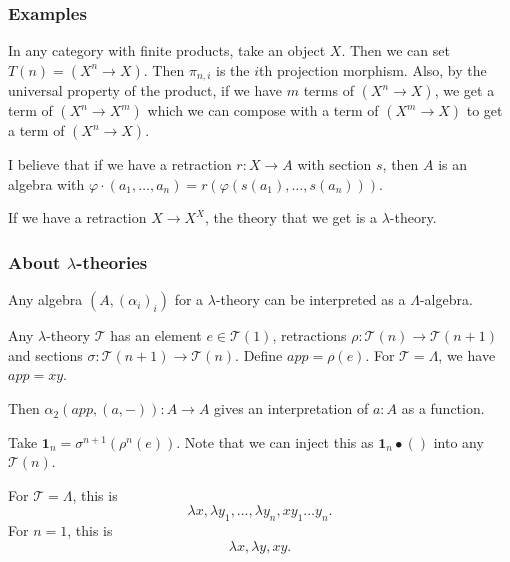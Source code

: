 \documentclass[aspectratio=169]{fancyslides} %
\begin{document}
  \begin{frame}
    \frametitle{Examples}

    In any category with finite products, take an object $ X $. Then we can set $ T(n) = (X^n \to X) $. Then $ \pi_{n, i} $ is the $ i $th projection morphism. Also, by the universal property of the product, if we have $ m $ terms of $ (X^n \to X) $, we get a term of $ (X^n \to X^m) $ which we can compose with a term of $ (X^m \to X) $ to get a term of $ (X^n \to X) $.

    \pause
    \vfill

    I believe that if we have a retraction $ r: X \to A $ with section $ s $, then $ A $ is an algebra with $ \varphi \cdot (a_1, \dots, a_n) = r(\varphi(s(a_1), \dots, s(a_n))) $.

    \pause
    \vfill

    If we have a retraction $ X \to X^X $, the theory that we get is a $ \lambda $-theory.
  \end{frame}

  \begin{frame}
    \frametitle{About $ \lambda $-theories}

    Any algebra $ (A, (\alpha_i)_i) $ for a $ \lambda $-theory can be interpreted as a $ \Lambda $-algebra.

    \pause
    \vfill

    Any $ \lambda $-theory $ \mathcal T $ has an element $ e \in \mathcal T(1) $, retractions $ \rho: \mathcal T(n) \to \mathcal T(n + 1) $ and sections $ \sigma: \mathcal T(n + 1) \to \mathcal T(n) $. Define $ app = \rho(e) $. For $ \mathcal T = \Lambda $, we have $ app = xy $.

    \pause
    
    Then $ \alpha_2(app, (a, -)): A \to A $ gives an interpretation of $ a : A $ as a function.

    \vfill
    \pause

    Take $ \mathbf 1_n = \sigma^{n+1}(\rho^n(e)) $. Note that we can inject this as $ \mathbf 1_n \bullet () $ into any $ \mathcal T(n) $.
    
    For $ \mathcal T = \Lambda $, this is
    \[ \lambda x, \lambda y_1, \dots, \lambda y_n, x y_1 \dots y_n. \]
    \pause
    For $ n = 1 $, this is
    \[ \lambda x, \lambda y, xy. \]
  \end{frame}
\end{document}
